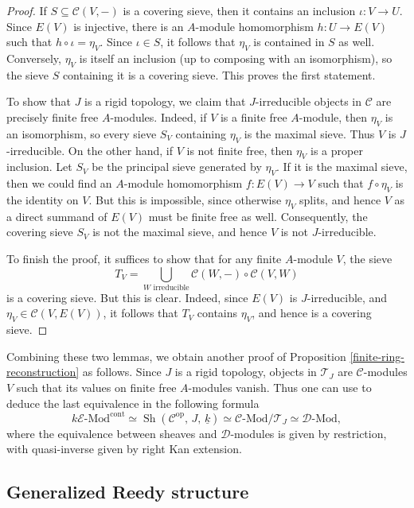 \documentclass[10pt, reqno]{amsart}
\theoremstyle{plain}
\numberwithin{equation}{section}
\theoremstyle{definition}
\newcommand{\Sh}{\operatorname{Sh}}
\newcommand{\Mod}{{\textrm{-}\mathrm{Mod}}}
\newcommand{\op}{\mathrm{op}}
\newcommand{\E}{\mathscr E}
\newcommand{\C}{\mathscr C}
\newcommand{\D}{\mathscr D}
\newcommand{\T}{\mathcal T}
\begin{document}
\begin{proof}
If $S \subseteq \C(V, -)$ is a covering sieve, then it contains an inclusion $\iota: V \to U$. Since $E(V)$ is injective, there is an $A$-module homomorphism $h: U \to E(V)$ such that $h \circ \iota = \eta_V$. Since $\iota \in S$, it follows that $\eta_V$ is contained in $S$ as well. Conversely, $\eta_V$ is itself an inclusion (up to composing with an isomorphism), so the sieve $S$ containing it is a covering sieve. This proves the first statement.

To show that $J$ is a rigid topology, we claim that $J$-irreducible objects in $\C$ are precisely finite free $A$-modules. Indeed, if $V$ is a finite free $A$-module, then $\eta_V$ is an isomorphism, so every sieve $S_V$ containing $\eta_V$ is the maximal sieve. Thus $V$ is $J$-irreducible. On the other hand, if $V$ is not finite free, then $\eta_V$ is a proper inclusion. Let $S_V$ be the principal sieve generated by $\eta_V$. If it is the maximal sieve, then we could find an $A$-module homomorphism $f: E(V) \to V$ such that $f \circ \eta_V$ is the identity on $V$. But this is impossible, since otherwise $\eta_V$ splits, and hence $V$ as a direct summand of $E(V)$ must be finite free as well. Consequently, the covering sieve $S_V$ is not the maximal sieve, and hence $V$ is not $J$-irreducible.

To finish the proof, it suffices to show that for any finite $A$-module $V$, the sieve
\[
T_V = \bigcup_{W \text{ irreducible}} \C(W, -) \circ \C(V, W)
\]
is a covering sieve. But this is clear. Indeed, since $E(V)$ is $J$-irreducible, and $\eta_V \in \C(V, E(V))$, it follows that $T_V$ contains $\eta_V$, and hence is a covering sieve.
\end{proof}

Combining these two lemmas, we obtain another proof of Proposition \ref{finite-ring-reconstruction} as follows. Since $J$ is a rigid topology, objects in $\T_J$ are $\C$-modules $V$ such that its values on finite free $A$-modules vanish. Thus one can use \cite[C2.2, Theorem 2.2.3]{Jo} to deduce the last equivalence in the following formula
\[
k\E \Mod^{\mathrm{cont}} \simeq \Sh(\C^{\op},\, J, \, \underline{k}) \simeq \C \Mod/\T_J \simeq \D \Mod,
\]
where the equivalence between sheaves and $\D$-modules is given by restriction, with quasi-inverse given by right Kan extension.


\subsection{Generalized Reedy structure}
\end{document}
